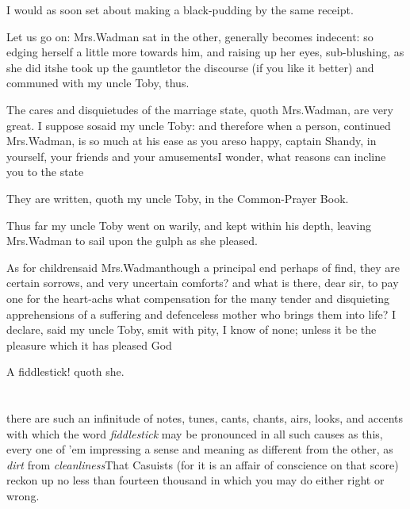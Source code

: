 \documentclass{article}
\begin{document}
\tsh I would as soon set about\break
making a black-pudding by the same\break
receipt.

Let us go on: Mrs.\@ Wadman sat in\break
{} 
the other, generally becomes
indecent: so edging herself a little more towards him, and raising
up her eyes, sub-blushing, as she did it\tsh she took up
the gauntlet\tsh or the discourse (if you like it better)
and communed with my uncle Toby, thus.

The cares and disquietudes of the marriage state, quoth Mrs.\@ Wadman, are very
great. I suppose so\tsk said my uncle Toby: and therefore when a person, continued
Mrs.\@ Wadman, is so much at his ease as you are\tsk so happy, captain
Shandy, in yourself, your friends and your amusements\tsk I wonder, what
reasons can incline you to the state\tsh


\tsh They are written, quoth my uncle Toby, in
the Common-Prayer Book.


Thus far my uncle Toby went on warily, and kept within
his depth, leaving Mrs.\@ Wadman to sail upon the gulph as she
pleased.

\etp
\tsk As for children\tsk said Mrs.\@ Wadman\tsk though a principal end perhaps of\break 
{}
find, they are certain sorrows, and very uncertain comforts? and what is there,
dear sir, to pay one for the heart-achs\tsk\break
what compensation for the many tender and
disquieting apprehensions of a suffering and defenceless mother who brings them into
life? I declare, said my uncle Toby, smit with pity, I know of none; unless it be
the pleasure which it has pleased God\tsh

\tsh A fiddlestick! quoth she.

\vfill{}\eject
\null{}\baselineskip
\section{}

 there are such an infinitude of
notes, tunes, cants, chants, airs, looks, and accents with which
the word \textit{fiddlestick} may be pronounced in all
such causes as this, every one of ’em impressing a sense and
meaning as different from the other, as \textit{dirt} from
\textit{cleanliness}\break\tsk That Casuists (for it is an affair of
conscience on that score) reckon up no less than fourteen thousand
in which you may do either right or wrong.
\end{document}
